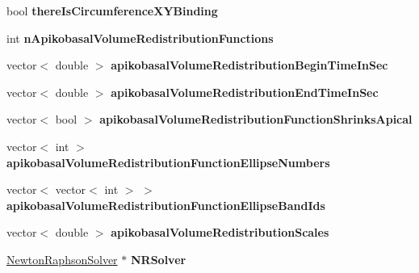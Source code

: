 \begin{DoxyCompactItemize}
\item 
\hypertarget{classSimulation_a38a26592cb20108652c8101026de864b}{}bool {\bfseries there\+Is\+Circumference\+X\+Y\+Binding}\label{classSimulation_a38a26592cb20108652c8101026de864b}

\item 
\hypertarget{classSimulation_a59a682ea8f4bc5986abe72760b448e65}{}int {\bfseries n\+Apikobasal\+Volume\+Redistribution\+Functions}\label{classSimulation_a59a682ea8f4bc5986abe72760b448e65}

\item 
\hypertarget{classSimulation_a7756714b54a2917b7ae7ab8aa027ddd2}{}vector$<$ double $>$ {\bfseries apikobasal\+Volume\+Redistribution\+Begin\+Time\+In\+Sec}\label{classSimulation_a7756714b54a2917b7ae7ab8aa027ddd2}

\item 
\hypertarget{classSimulation_aed2334c12970d1fb6c6f304b4ee71ce6}{}vector$<$ double $>$ {\bfseries apikobasal\+Volume\+Redistribution\+End\+Time\+In\+Sec}\label{classSimulation_aed2334c12970d1fb6c6f304b4ee71ce6}

\item 
\hypertarget{classSimulation_a311218e75b3cca41c1165ab4a555ad55}{}vector$<$ bool $>$ {\bfseries apikobasal\+Volume\+Redistribution\+Function\+Shrinks\+Apical}\label{classSimulation_a311218e75b3cca41c1165ab4a555ad55}

\item 
\hypertarget{classSimulation_a20768f5b492cb75be15afa1ace01f8b6}{}vector$<$ int $>$ {\bfseries apikobasal\+Volume\+Redistribution\+Function\+Ellipse\+Numbers}\label{classSimulation_a20768f5b492cb75be15afa1ace01f8b6}

\item 
\hypertarget{classSimulation_a7a30bd1f7da08d3d7a38158e7d56aca5}{}vector$<$ vector$<$ int $>$ $>$ {\bfseries apikobasal\+Volume\+Redistribution\+Function\+Ellipse\+Band\+Ids}\label{classSimulation_a7a30bd1f7da08d3d7a38158e7d56aca5}

\item 
\hypertarget{classSimulation_a5803747fdae6781c7a7b39c586dadd9d}{}vector$<$ double $>$ {\bfseries apikobasal\+Volume\+Redistribution\+Scales}\label{classSimulation_a5803747fdae6781c7a7b39c586dadd9d}

\item 
\hypertarget{classSimulation_a3d66302c4db767b917c866460d34a4c6}{}\hyperlink{classNewtonRaphsonSolver}{Newton\+Raphson\+Solver} $\ast$ {\bfseries N\+R\+Solver}\label{classSimulation_a3d66302c4db767b917c866460d34a4c6}

\end{DoxyCompactItemize}


